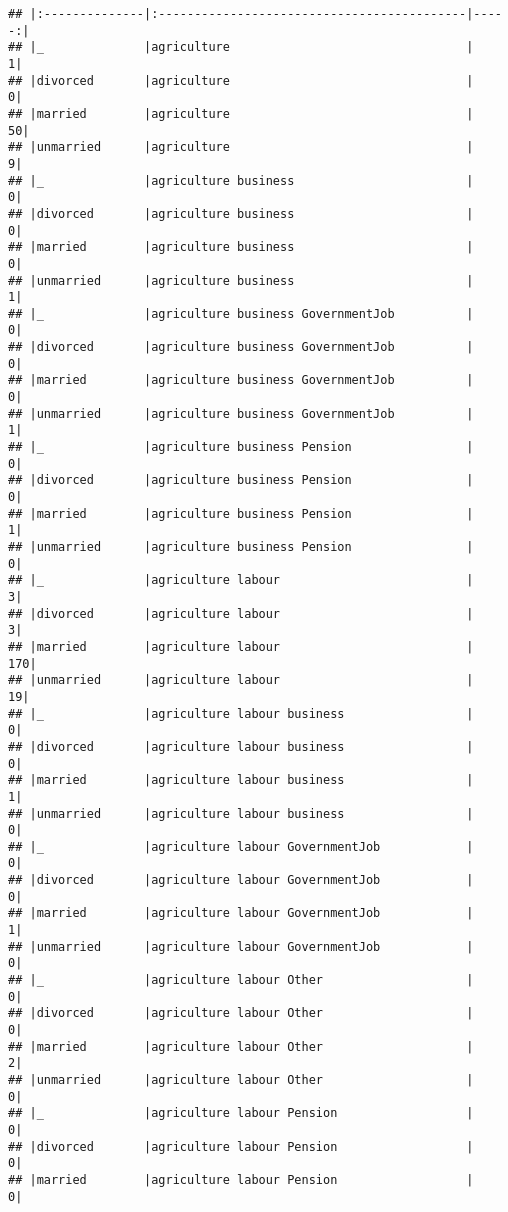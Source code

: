 \documentclass[
]{article}
\begin{document}
\begin{verbatim}
## |:--------------|:-------------------------------------------|-----:|
## |_              |agriculture                                 |     1|
## |divorced       |agriculture                                 |     0|
## |married        |agriculture                                 |    50|
## |unmarried      |agriculture                                 |     9|
## |_              |agriculture business                        |     0|
## |divorced       |agriculture business                        |     0|
## |married        |agriculture business                        |     0|
## |unmarried      |agriculture business                        |     1|
## |_              |agriculture business GovernmentJob          |     0|
## |divorced       |agriculture business GovernmentJob          |     0|
## |married        |agriculture business GovernmentJob          |     0|
## |unmarried      |agriculture business GovernmentJob          |     1|
## |_              |agriculture business Pension                |     0|
## |divorced       |agriculture business Pension                |     0|
## |married        |agriculture business Pension                |     1|
## |unmarried      |agriculture business Pension                |     0|
## |_              |agriculture labour                          |     3|
## |divorced       |agriculture labour                          |     3|
## |married        |agriculture labour                          |   170|
## |unmarried      |agriculture labour                          |    19|
## |_              |agriculture labour business                 |     0|
## |divorced       |agriculture labour business                 |     0|
## |married        |agriculture labour business                 |     1|
## |unmarried      |agriculture labour business                 |     0|
## |_              |agriculture labour GovernmentJob            |     0|
## |divorced       |agriculture labour GovernmentJob            |     0|
## |married        |agriculture labour GovernmentJob            |     1|
## |unmarried      |agriculture labour GovernmentJob            |     0|
## |_              |agriculture labour Other                    |     0|
## |divorced       |agriculture labour Other                    |     0|
## |married        |agriculture labour Other                    |     2|
## |unmarried      |agriculture labour Other                    |     0|
## |_              |agriculture labour Pension                  |     0|
## |divorced       |agriculture labour Pension                  |     0|
## |married        |agriculture labour Pension                  |     0|

\end{verbatim}
\end{document}
